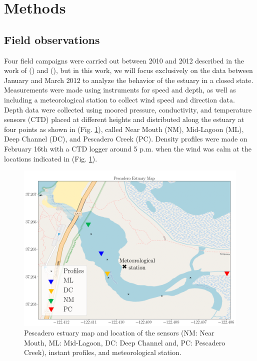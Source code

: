 \documentclass[11pt,letterpaper]{article}
\begin{document}
\section{Methods}

\subsection{Field observations}

Four field campaigns were carried out between 2010 and 2012 described in the work of \citeauthor{Williams2014} (\cite*{Williams2014}) and \citeauthor{williams2016} (\cite*{williams2016}), but in this work, we will focus exclusively on the data between January and March 2012 to analyze the behavior of the estuary in a closed state. Measurements were made using instruments for speed and depth, as well as including a meteorological station to collect wind speed and direction data. Depth data were collected using moored pressure, conductivity, and temperature sensors (CTD) placed at different heights and distributed along the estuary at four points as shown in (Fig. \ref{fig:mapPDO}), called Near Mouth (NM), Mid-Lagoon (ML), Deep Channel (DC), and Pescadero Creek (PC). Density profiles were made on February 16th with a CTD logger around 5 p.m. when the wind was calm at the locations indicated in (Fig. \ref{fig:mapPDO}).


\begin{figure}[h!]
    \centering
    \includegraphics[scale=0.6]{Imagenes/mapa2.png}
    \caption{Pescadero estuary map and location of the sensors (NM: Near Mouth, ML: Mid-Lagoon, DC: Deep Channel and, PC: Pescadero Creek), instant profiles, and meteorological station. }
    \label{fig:mapPDO}
\end{figure}
\end{document}
